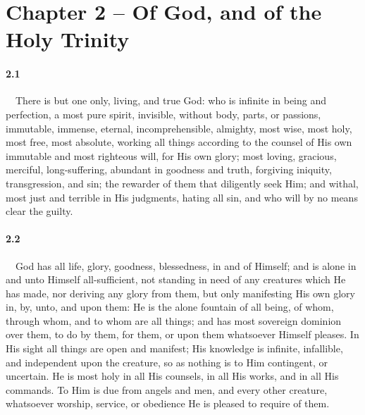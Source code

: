 \section{Chapter 2 -- Of God, and of the Holy Trinity} 

\paragraph{2.1}\ \ There is but one only, living, and true God: who is infinite in being and perfection, a most pure spirit, invisible, without body, parts, or passions, immutable, immense, eternal, incomprehensible, almighty, most wise, most holy, most free, most absolute, working all things according to the counsel of His own immutable and most righteous will, for His own glory; most loving, gracious, merciful, long-suffering, abundant in goodness and truth, forgiving iniquity, transgression, and sin; the rewarder of them that diligently seek Him; and withal, most just and terrible in His judgments, hating all sin, and who will by no means clear the guilty.    
\bigskip
\paragraph{2.2}\ \ God has all life, glory, goodness, blessedness, in and of Himself; and is alone in and unto Himself all-sufficient, not standing in need of any creatures which He has made, nor deriving any glory from them, but only manifesting His own glory in, by, unto, and upon them: He is the alone fountain of all being, of whom, through whom, and to whom are all things; and has most sovereign dominion over them, to do by them, for them, or upon them whatsoever Himself pleases. In His sight all things are open and manifest; His knowledge is infinite, infallible, and independent upon the creature, so as nothing is to Him contingent, or uncertain. He is most holy in all His counsels, in all His works, and in all His commands. To Him is due from angels and men, and every other creature, whatsoever worship, service, or obedience He is pleased to require of them.    
\bigskip
